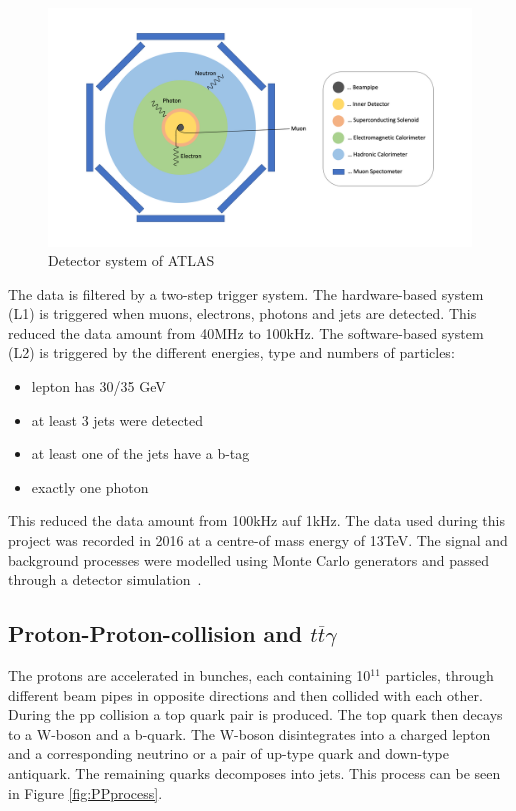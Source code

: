 \documentclass[11pt]{scrartcl}
\begin{document}
	\begin{figure}[H]
	\centering
	\includegraphics[width=1\textwidth]{figures/detector_system.png}
	\caption{Detector system of ATLAS}
	\label{fig:detectorsystem}
	\end{figure}
	
	The data is filtered by a two-step trigger system. The hardware-based system (L1) is triggered when muons, electrons, photons and jets are detected. This reduced the data amount from 40MHz to 100kHz. The software-based system (L2) is triggered by the different energies, type and numbers of particles:
	
\begin{itemize}
  \item lepton has 30/35 GeV
  \item at least 3 jets were detected
  \item at least one of the jets have a b-tag
  \item exactly one photon
\end{itemize}

This reduced the data amount from 100kHz auf 1kHz. The data used during this project was recorded in 2016 at a centre-of mass energy of 13TeV. The signal and background processes were modelled using Monte Carlo generators and passed through a detector simulation~\cite{ATLAS}. 

	\subsection{Proton-Proton-collision and $t\overline{t}\gamma$}
	 \label{sec:PPprocess}
	The protons are accelerated in bunches, each containing 10$^{11}$ particles, through different beam pipes in opposite directions and then collided with each other. During the pp collision a top quark pair is produced. The top quark then decays to a W-boson and a b-quark. The W-boson disintegrates into a charged lepton and a corresponding neutrino or a pair of up-type quark and down-type antiquark. The remaining quarks decomposes into jets. This process can be seen in Figure \ref{fig:PPprocess}.
	
\end{document}
